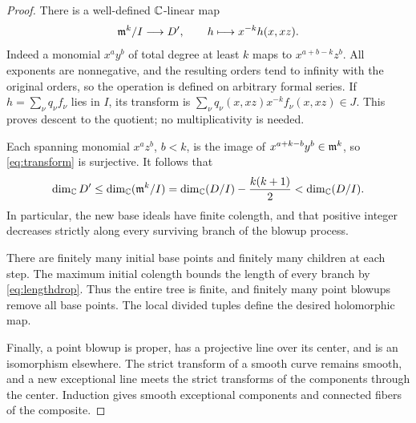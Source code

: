 \begin{proof}
There is a well-defined \(\mathbb C\)-linear map
\begin{equation}\label{eq:transform}
\mathfrak m^k/I\longrightarrow D',\qquad
h\longmapsto x^{-k}h(x,xz).
\end{equation}
Indeed a monomial \(x^ay^b\) of total degree at least \(k\)
maps to \(x^{a+b-k}z^b\). All exponents are nonnegative, and
the resulting orders tend to infinity with the original
orders, so the operation is defined on arbitrary formal series.
If \(h=\sum_\nu q_\nu f_\nu\) lies in \(I\), its transform is
\(\sum_\nu q_\nu(x,xz)x^{-k}f_\nu(x,xz)\in J\).
This proves descent to the quotient; no multiplicativity is
needed.

Each spanning monomial \(x^az^b\), \(b<k\), is the image of
\(x^{a+k-b}y^b\in\mathfrak m^k\), so \eqref{eq:transform} is surjective.
It follows that
\begin{equation}\label{eq:lengthdrop}
\dim_\mathbb C D'
\le \dim_\mathbb C(\mathfrak m^k/I)
=\dim_\mathbb C(D/I)-\frac{k(k+1)}2
<\dim_\mathbb C(D/I).
\end{equation}
In particular, the new base ideals have finite colength, and
that positive integer decreases strictly along every surviving
branch of the blowup process.

There are finitely many initial base points and finitely many
children at each step. The maximum initial colength bounds
the length of every branch by \eqref{eq:lengthdrop}. Thus the
entire tree is finite, and finitely many point blowups remove
all base points. The local divided tuples define the desired
holomorphic map.

Finally, a point blowup is proper, has a projective line over
its center, and is an isomorphism elsewhere.
The strict transform of a smooth curve remains smooth, and
a new exceptional line meets the strict transforms of the
components through the center. Induction gives smooth
exceptional components and connected fibers of the composite.
\end{proof}
